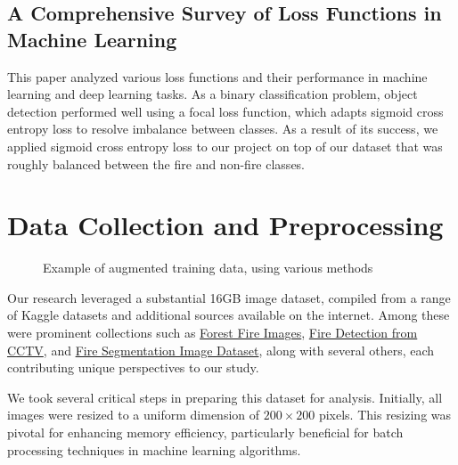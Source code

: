 \subsection{A Comprehensive Survey of Loss Functions in Machine Learning~\citep{Wang2022}}

This paper analyzed various loss functions and their performance in machine learning and deep learning tasks. As a binary classification problem, object detection performed well using a focal loss function, which adapts sigmoid cross entropy loss to resolve imbalance between classes. As a result of its success, we applied sigmoid cross entropy loss to our project on top of our dataset that was roughly balanced between the fire and non-fire classes.

\section{Data Collection and Preprocessing}


\begin{figure}[htbp]
	\centering
	\qquad
	\qquad

	\qquad
	\qquad
	\caption{
		Example of augmented training data, using various methods
	}%
	\label{preprocessing}
\end{figure}

Our research leveraged a substantial 16GB image dataset, compiled from a range of Kaggle datasets and additional sources available on the internet. Among these were prominent collections such as \href{https://www.kaggle.com/datasets/mohnishsaiprasad/forest-fire-images}{Forest Fire Images}, \href{https://www.kaggle.com/datasets/ritupande/fire-detection-from-cctv}{Fire Detection from CCTV}, and \href{https://www.kaggle.com/datasets/diversisai/fire-segmentation-image-dataset}{Fire Segmentation Image Dataset}, along with several others, each contributing unique perspectives to our study.

We took several critical steps in preparing this dataset for analysis. Initially, all images were resized to a uniform dimension of \(200 \times 200\) pixels. This resizing was pivotal for enhancing memory efficiency, particularly beneficial for batch processing techniques in machine learning algorithms.

